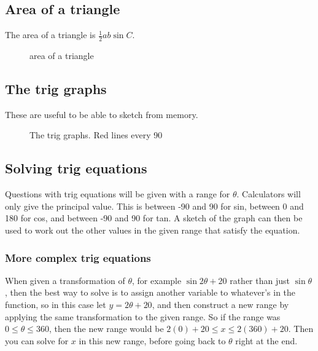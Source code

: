 \subsection{Area of a triangle}
The area of a triangle is $\frac{1}{2}ab\sin{C}$.
\begin{figure}[ht]
    \centering
    \caption{area of a triangle}
    \label{fig:Area-of-a-triangle}
\end{figure}

\subsection{The trig graphs}
These are useful to be able to sketch from memory.
\begin{figure}[ht]
    \centering
    \caption{The trig graphs. Red lines every 90\textdegree}
    \label{fig:the-trig-graphs}
\end{figure}

\subsection{Solving trig equations}
Questions with trig equations will be given with a range for $\theta$. Calculators will only give the principal value. This is between -90 and 90 for sin, between 0 and 180 for cos, and between -90 and 90 for tan. A sketch of the graph can then be used to work out the other values in the given range that satisfy the equation.
\subsubsection{More complex trig equations}
When given a transformation of $\theta$, for example $\sin{2\theta+20}$ rather than just $\sin{\theta}$, then the best way to solve is to assign another variable to whatever's in the function, so in this case let $y=2\theta+20$, and then construct a new range by applying the same transformation to the given range. So if the range was $0\leq\theta\leq360$, then the new range would be $2(0)+20\leq x\leq 2(360)+20$. Then you can solve for $x$ in this new range, before going back to $\theta$ right at the end.

